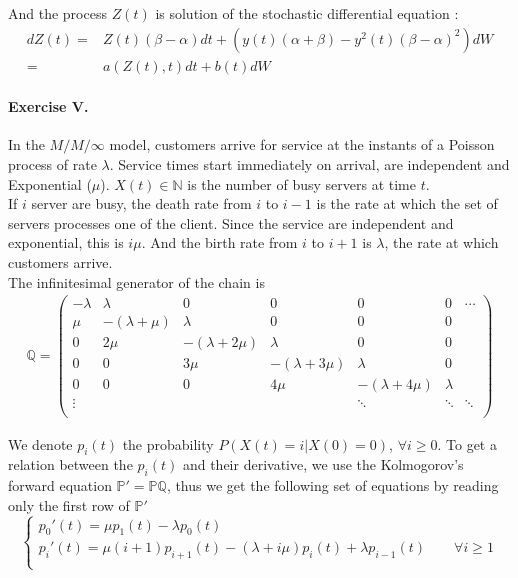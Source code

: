 \documentclass{article}
\begin{document}
And the process $Z(t)$ is solution of the stochastic differential equation :
\begin{align*}
dZ(t)=&Z(t)(\beta-\alpha)dt+(y(t)(\alpha+\beta)-y^2(t)(\beta-\alpha)^2)dW \\
=& a(Z(t),t)dt+b(t)dW
\end{align*}

















\paragraph{Exercise V.\\}

In the $M/M/\infty$ model, customers arrive for service at the instants of a Poisson process of rate $\lambda$. Service times start immediately on arrival, are independent and Exponential ($\mu$). $X(t)\in \mathbb{N}$ is the number of busy servers at time $t$. \\

If $i$ server are busy, the death rate from $i$ to $i-1$ is the rate at which the set of servers processes one of the client. Since the service are independent and exponential, this is $i\mu$. And the birth rate from $i$ to $i+1$ is $\lambda$, the rate at which customers arrive. \\

The infinitesimal generator of the chain is 
\begin{align*}
\mathbb{Q}=
\begin{pmatrix}
-\lambda & \lambda & 0 & 0 & 0 & 0 &\cdots  \\
\mu & -(\lambda+\mu) & \lambda & 0 & 0 & 0 & \\
0 & 2\mu & -(\lambda+2\mu) & \lambda  & 0 & 0 & \\
0 & 0 & 3\mu & -(\lambda+3\mu) & \lambda  & 0 &  \\
0 & 0 & 0 & 4\mu & -(\lambda+4\mu) & \lambda  &  \\
\vdots &  &  &  & \ddots & \ddots & \ddots  \\
\end{pmatrix}
\end{align*}

We denote $p_i(t)$ the probability $P(X(t)=i|X(0)=0)$, $\forall i \geq 0$. To get a relation between the $p_i(t)$ and their derivative, we use the Kolmogorov's forward equation $\mathbb{P}'=\mathbb{PQ}$, thus we get the following set of equations by reading only the first row of $\mathbb{P}'$
$$
\left \{
\begin{array}{l}
        p_0'(t)=\mu p_1(t)- \lambda p_0(t) \\
		p_i'(t)=\mu(i+1)p_{i+1}(t) -(\lambda+i\mu)p_i(t)+\lambda p_{i-1}(t) \qquad \forall i \geq 1 \\
    \end{array}
\right. 
$$
\end{document}
